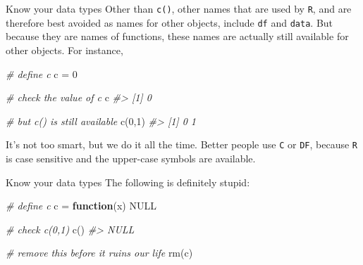 \documentclass[
  11pt,
  ignorenonframetext,
  svgnames, handout, t]{beamer}
\newenvironment{Shaded}{\begin{snugshade}}{\end{snugshade}}
\newcommand{\CommentTok}[1]{\textcolor[rgb]{0.56,0.35,0.01}{\textit{#1}}}
\newcommand{\ConstantTok}[1]{\textcolor[rgb]{0.00,0.00,0.00}{#1}}
\newcommand{\ControlFlowTok}[1]{\textcolor[rgb]{0.13,0.29,0.53}{\textbf{#1}}}
\newcommand{\DecValTok}[1]{\textcolor[rgb]{0.00,0.00,0.81}{#1}}
\newcommand{\FunctionTok}[1]{\textcolor[rgb]{0.00,0.00,0.00}{#1}}
\newcommand{\NormalTok}[1]{#1}
\newcommand{\OtherTok}[1]{\textcolor[rgb]{0.56,0.35,0.01}{#1}}
\begin{document}
\begin{frame}[fragile]{Know your data types}
\protect\hypertarget{know-your-data-types-1}{}
Other than \texttt{c()}, other names that are used by \texttt{R}, and
are therefore best avoided as names for other objects, include
\texttt{df} and \texttt{data}. But because they are names of functions,
these names are actually still available for other objects. For
instance,

\footnotesize

\begin{Shaded}
\begin{Highlighting}[]
\CommentTok{\# define c}
\NormalTok{c }\OtherTok{=} \DecValTok{0}

\CommentTok{\# check the value of c}
\NormalTok{c}
\CommentTok{\#\textgreater{} [1] 0}

\CommentTok{\# but c() is still available}
\FunctionTok{c}\NormalTok{(}\DecValTok{0}\NormalTok{,}\DecValTok{1}\NormalTok{)}
\CommentTok{\#\textgreater{} [1] 0 1}
\end{Highlighting}
\end{Shaded}

\normalsize It's not too smart, but we do it all the time. Better people
use \texttt{C} or \texttt{DF}, because \texttt{R} is case sensitive and
the upper-case symbols are available.
\end{frame}

\begin{frame}[fragile]{Know your data types}
\protect\hypertarget{know-your-data-types-2}{}
The following is definitely stupid:

\footnotesize

\begin{Shaded}
\begin{Highlighting}[]
\CommentTok{\# define c}
\NormalTok{c }\OtherTok{=} \ControlFlowTok{function}\NormalTok{(x) }\ConstantTok{NULL}

\CommentTok{\# check c(0,1)}
\FunctionTok{c}\NormalTok{()}
\CommentTok{\#\textgreater{} NULL}

\CommentTok{\# remove this before it ruins our life}
\FunctionTok{rm}\NormalTok{(c)}
\end{Highlighting}
\end{Shaded}

\normalsize
\end{frame}
\end{document}
